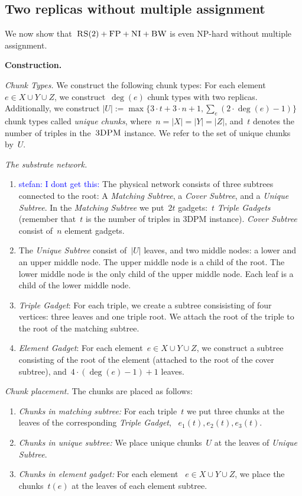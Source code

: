 \documentclass[preprint,12pt]{elsarticle}
\newcommand{\stefan}[1]{\textcolor{blue}{stefan: #1}}
\newcommand{\CC}{\textsc{NI}}
\newcommand{\FP}{\textsc{FP}}
\newcommand{\RS}{\textsc{RS}}
\newcommand{\BW}{\textsc{BW}}
\newcommand{\TDPM}{\textsc{3DPM}}
\newcommand{\UnqSubtree}{{{\emph{Unique Subtree}}}}
\newcommand{\MatchSubtree}{{\emph{Matching Subtree}}}
\newcommand{\CoverSubtree}{{\emph{Cover Subtree}}}
\newcommand{\TripleGadget}{{\emph{Triple Gadget}}}
\newcommand{\TripleGadgets}{{\emph{Triple Gadgets}}}
\newcommand{\ElGadget}{{\emph{Element Gadget}}}
\begin{document}
\subsection{Two replicas without multiple assignment}

We now show that~$\RS(2)+\FP+\CC+\BW$ is even NP-hard without multiple
assignment.

\noindent \textbf{Construction.}

\emph{Chunk Types.}  We construct the following chunk types: For each
element~$e\in X\cup Y\cup Z$, we construct~$\deg(e)$ chunk types with
two replicas. Additionally, we construct
$|U| := \max\{3\cdot t + 3\cdot n + 1, \sum_e(2\cdot \deg(e)-1)\}$
chunk types called \emph{unique chunks}, where~$n = |X| = |Y| = |Z|$,
and~$t$ denotes the number of triples in the~$\TDPM$ instance. We
refer to the set of unique chunks by~$U$.

\emph{The substrate network.}

\begin{enumerate}
  \item \stefan{I dont get this:} The physical network consists of three subtrees connected to
  the root: A {\MatchSubtree}, a {\CoverSubtree}, and a
  {\UnqSubtree}. In the {\MatchSubtree} we put~$2t$ gadgets:~$t$
  {\TripleGadgets} (remember that~$t$ is the number of triples in
  {\TDPM} instance). {\CoverSubtree} consist of~$n$ element gadgets.
  \item The {\UnqSubtree} consist of~$|U|$ leaves, and two middle nodes:
  a lower and an upper middle node. The upper middle node is a child of the root. The lower
  middle node is the only child of the upper middle node. Each leaf is a
  child of the lower middle node.
  \item \TripleGadget: For each triple, we create a subtree
  consisisting of four vertices: three leaves and one triple root.  We
  attach the root of the triple to the root of the matching subtree.
  \item \ElGadget: For each element~$e \in X\cup Y\cup Z$, we
  construct a subtree consisting of the root of the element (attached
  to the root of the cover subtree), and~$4\cdot(\deg(e)-1)+1$ leaves.
\end{enumerate}

\emph{Chunk placement.}
The chunks are placed as follows:
\begin{enumerate}
  \item \emph{Chunks in matching subtree:} For each triple~$t$ we put
  three chunks at the leaves of the corresponding \TripleGadget,
 ~$e_1(t), e_2(t), e_3(t)$.
  \item \emph{Chunks in unique subtree:} We place unique chunks~$U$ at
  the leaves of {\UnqSubtree}.
  \item \emph{Chunks in element gadget:} For each element
 ~$e\in X\cup Y\cup Z$, we place the chunks~$t(e)$ at the leaves of
  each element subtree.
\end{enumerate}
\end{document}
